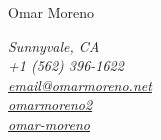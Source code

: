 \documentclass[10pt]{article}
\begin{document}
    \noindent
    \begin{minipage}[c]{0.5\textwidth}
        \begin{flushleft}
            \Huge{Omar Moreno}
        \end{flushleft}
    \end{minipage}
    \begin{minipage}[c]{0.50\textwidth}
        \begin{flushright}
            \color{dimgray} \em
            Sunnyvale, CA           \\
            \faMobilePhone \hspace{1pt} +1 (562) 396-1622       \\
            \faEnvelope \hspace{1pt} \href{mailto:email@omarmoreno.net}{email@omarmoreno.net}             \\
            \faLinkedin \hspace{1pt} \href{https://www.linkedin.com/in/omarmoreno2}{omarmoreno2}          \\
            \faGithub \hspace{1pt} \href{https://github.com/omar-moreno}{omar-moreno}                     \\
        \end{flushright}
    \end{minipage}
\end{document}
